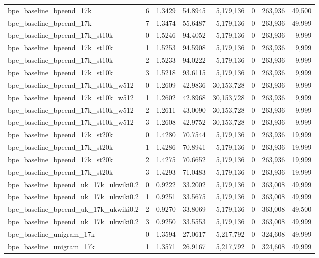 \begin{tabular}{lrrrrrrr}
bpe\_baseline\_bpeend\_17k & 6 & 1.3429 & 54.8945 & 5,179,136 & 0 & 263,936 & 49,500 \\
bpe\_baseline\_bpeend\_17k & 7 & 1.3474 & 55.6487 & 5,179,136 & 0 & 263,936 & 49,999 \\
bpe\_baseline\_bpeend\_17k\_st10k & 0 & 1.5246 & 94.4052 & 5,179,136 & 0 & 263,936 & 9,999 \\
bpe\_baseline\_bpeend\_17k\_st10k & 1 & 1.5253 & 94.5908 & 5,179,136 & 0 & 263,936 & 9,999 \\
bpe\_baseline\_bpeend\_17k\_st10k & 2 & 1.5233 & 94.0222 & 5,179,136 & 0 & 263,936 & 9,999 \\
bpe\_baseline\_bpeend\_17k\_st10k & 3 & 1.5218 & 93.6115 & 5,179,136 & 0 & 263,936 & 9,999 \\
bpe\_baseline\_bpeend\_17k\_st10k\_w512 & 0 & 1.2609 & 42.9836 & 30,153,728 & 0 & 263,936 & 9,999 \\
bpe\_baseline\_bpeend\_17k\_st10k\_w512 & 1 & 1.2602 & 42.8968 & 30,153,728 & 0 & 263,936 & 9,999 \\
bpe\_baseline\_bpeend\_17k\_st10k\_w512 & 2 & 1.2611 & 43.0090 & 30,153,728 & 0 & 263,936 & 9,999 \\
bpe\_baseline\_bpeend\_17k\_st10k\_w512 & 3 & 1.2608 & 42.9752 & 30,153,728 & 0 & 263,936 & 9,999 \\
bpe\_baseline\_bpeend\_17k\_st20k & 0 & 1.4280 & 70.7544 & 5,179,136 & 0 & 263,936 & 19,999 \\
bpe\_baseline\_bpeend\_17k\_st20k & 1 & 1.4286 & 70.8941 & 5,179,136 & 0 & 263,936 & 19,999 \\
bpe\_baseline\_bpeend\_17k\_st20k & 2 & 1.4275 & 70.6652 & 5,179,136 & 0 & 263,936 & 19,999 \\
bpe\_baseline\_bpeend\_17k\_st20k & 3 & 1.4293 & 71.0483 & 5,179,136 & 0 & 263,936 & 19,999 \\
bpe\_baseline\_bpeend\_uk\_17k\_ukwiki0.2 & 0 & 0.9222 & 33.2002 & 5,179,136 & 0 & 363,008 & 49,999 \\
bpe\_baseline\_bpeend\_uk\_17k\_ukwiki0.2 & 1 & 0.9251 & 33.5675 & 5,179,136 & 0 & 363,008 & 49,999 \\
bpe\_baseline\_bpeend\_uk\_17k\_ukwiki0.2 & 2 & 0.9270 & 33.8069 & 5,179,136 & 0 & 363,008 & 49,500 \\
bpe\_baseline\_bpeend\_uk\_17k\_ukwiki0.2 & 3 & 0.9250 & 33.5553 & 5,179,136 & 0 & 363,008 & 49,999 \\
bpe\_baseline\_unigram\_17k & 0 & 1.3594 & 27.0617 & 5,217,792 & 0 & 324,608 & 49,999 \\
bpe\_baseline\_unigram\_17k & 1 & 1.3571 & 26.9167 & 5,217,792 & 0 & 324,608 & 49,999 \\

\end{tabular}

